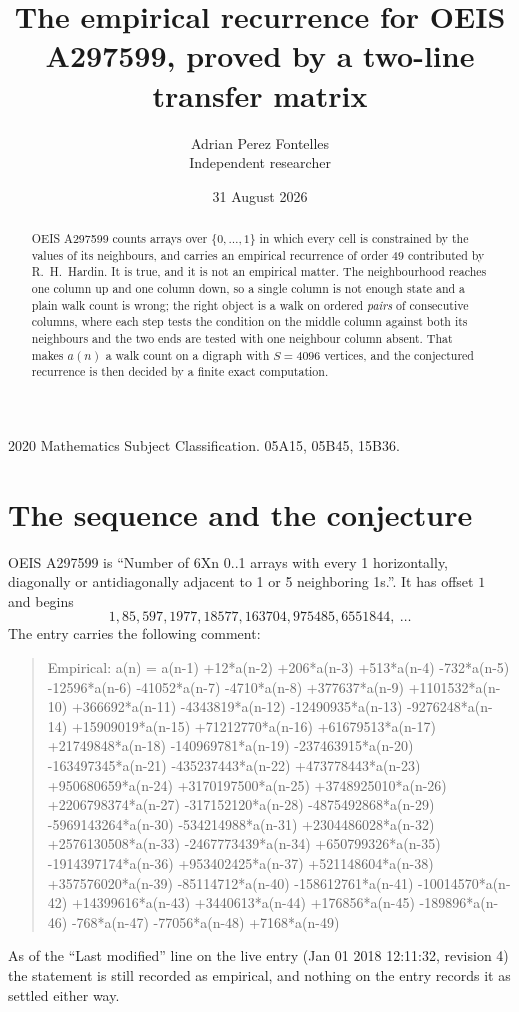 \documentclass[11pt,a4paper]{article}
\title{The empirical recurrence for OEIS A297599, proved by a two-line transfer matrix}
\author{Adrian Perez Fontelles\\ \small Independent researcher}
\date{31 August 2026}
\theoremstyle{plain}
\theoremstyle{definition}
\begin{document}
\maketitle

\begin{abstract}
OEIS A297599 counts arrays over $\{0,\dots,1\}$ in which every cell is constrained by the
values of its neighbours, and carries an empirical recurrence of order $49$ contributed
by R.~H.~Hardin. It is true, and it is not an empirical matter. The neighbourhood reaches one
column up and one column down, so a single column is not enough state and a plain walk count
is wrong; the right object is a walk on ordered \emph{pairs} of consecutive columns, where
each step tests the condition on the middle column against both its neighbours and the two
ends are tested with one neighbour column absent. That makes $a(n)$ a walk count on a digraph
with $S=4096$ vertices, and the conjectured recurrence is then decided by a finite exact
computation.
\end{abstract}

\noindent\small 2020 Mathematics Subject Classification. 05A15, 05B45, 15B36.\normalsize

\section{The sequence and the conjecture}

OEIS A297599 is ``Number of 6Xn 0..1 arrays with every 1 horizontally, diagonally or antidiagonally adjacent to 1 or 5 neighboring 1s.''. It has offset $1$ and begins
\[
1, 85, 597, 1977, 18577, 163704, 975485, 6551844,\ \dots
\]
The entry carries the following comment:
\begin{quote}\small
Empirical: a(n) = a(n-1) +12*a(n-2) +206*a(n-3) +513*a(n-4) -732*a(n-5) -12596*a(n-6) -41052*a(n-7) -4710*a(n-8) +377637*a(n-9) +1101532*a(n-10) +366692*a(n-11) -4343819*a(n-12) -12490935*a(n-13) -9276248*a(n-14) +15909019*a(n-15) +71212770*a(n-16) +61679513*a(n-17) +21749848*a(n-18) -140969781*a(n-19) -237463915*a(n-20) -163497345*a(n-21) -435237443*a(n-22) +473778443*a(n-23) +950680659*a(n-24) +3170197500*a(n-25) +3748925010*a(n-26) +2206798374*a(n-27) -317152120*a(n-28) -4875492868*a(n-29) -5969143264*a(n-30) -534214988*a(n-31) +2304486028*a(n-32) +2576130508*a(n-33) -2467773439*a(n-34) +650799326*a(n-35) -1914397174*a(n-36) +953402425*a(n-37) +521148604*a(n-38) +357576020*a(n-39) -85114712*a(n-40) -158612761*a(n-41) -10014570*a(n-42) +14399616*a(n-43) +3440613*a(n-44) +176856*a(n-45) -189896*a(n-46) -768*a(n-47) -77056*a(n-48) +7168*a(n-49)
\end{quote}
As of the ``Last modified'' line on the live entry (Jan 01 2018 12:11:32, revision 4) the statement is
still recorded as empirical, and nothing on the entry records it as settled either way.
\end{document}
